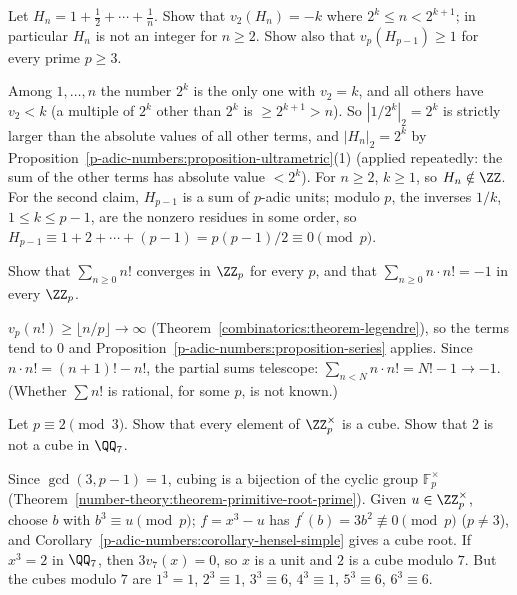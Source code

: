 \begin{exercise}\label{p-adic-numbers:exercise-harmonic}
Let $H_n = 1 + \frac12 + \cdots + \frac1n$. Show that $v_2(H_n) = -k$ where $2^k \leq n < 2^{k+1}$; in particular $H_n$ is not an integer for $n \geq 2$. Show also that $v_p(H_{p-1}) \geq 1$ for every prime $p \geq 3$.
\end{exercise}

\begin{solution}
Among $1, \ldots, n$ the number $2^k$ is the only one with $v_2 = k$, and all others have $v_2 < k$ (a multiple of $2^k$ other than $2^k$ is $\geq 2^{k+1} > n$). So $|1/2^k|_2 = 2^k$ is strictly larger than the absolute
values of all other terms, and $|H_n|_2 = 2^k$ by Proposition~\ref{p-adic-numbers:proposition-ultrametric}(1) (applied repeatedly: the sum of the other terms has absolute value $< 2^k$). For $n \geq 2$, $k \geq 1$, so
$H_n \notin \ZZ$. For the second claim, $H_{p-1}$ is a sum of $p$-adic units; modulo $p$, the inverses $1/k$, $1 \leq k \leq p - 1$, are the nonzero residues in some order, so
$H_{p-1} \equiv 1 + 2 + \cdots + (p - 1) = p(p - 1)/2 \equiv 0 \pmod p$.
\end{solution}

\begin{exercise}\label{p-adic-numbers:exercise-factorials}
Show that $\sum_{n \geq 0}n!$ converges in $\ZZ_p$ for every $p$, and that $\sum_{n \geq 0}n \cdot n! = -1$ in every $\ZZ_p$.
\end{exercise}

\begin{solution}
$v_p(n!) \geq \lfloor n/p\rfloor \to \infty$ (Theorem~\ref{combinatorics:theorem-legendre}), so the terms tend to $0$ and Proposition~\ref{p-adic-numbers:proposition-series} applies. Since
$n \cdot n! = (n + 1)! - n!$, the partial sums telescope: $\sum_{n < N}n \cdot n! = N! - 1 \to -1$. (Whether $\sum n!$ is rational, for some $p$, is not known.)
\end{solution}

\begin{exercise}\label{p-adic-numbers:exercise-cubes}
Let $p \equiv 2 \pmod 3$. Show that every element of $\ZZ_p^\times$ is a cube. Show that $2$ is not a cube in $\QQ_7$.
\end{exercise}

\begin{solution}
Since $\gcd(3, p - 1) = 1$, cubing is a bijection of the cyclic group $\mathbb{F}_p^\times$ (Theorem~\ref{number-theory:theorem-primitive-root-prime}). Given $u \in \ZZ_p^\times$, choose $b$ with $b^3 \equiv u \pmod p$;
$f = x^3 - u$ has $f^{\prime}(b) = 3b^2 \not\equiv 0 \pmod p$ ($p \neq 3$), and Corollary~\ref{p-adic-numbers:corollary-hensel-simple} gives a cube root. If $x^3 = 2$ in $\QQ_7$, then $3v_7(x) = 0$, so $x$ is a unit and $2$
is a cube modulo $7$. But the cubes modulo $7$ are $1^3 = 1$, $2^3 \equiv 1$, $3^3 \equiv 6$, $4^3 \equiv 1$, $5^3 \equiv 6$, $6^3 \equiv 6$.
\end{solution}

